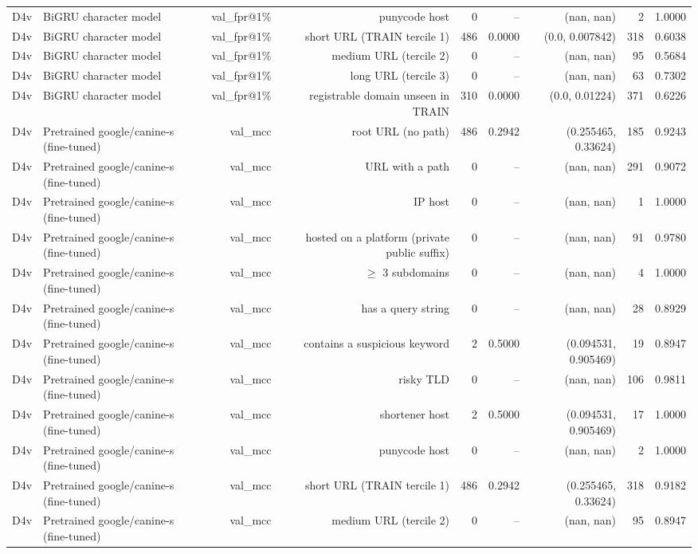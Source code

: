 \begin{table}[t]
\begin{tabular}{llrrrrrrr}
D4v & BiGRU character model & val\_fpr@1\% & punycode host & 0 & -- & (nan, nan) & 2 & 1.0000 \\
D4v & BiGRU character model & val\_fpr@1\% & short URL (TRAIN tercile 1) & 486 & 0.0000 & (0.0, 0.007842) & 318 & 0.6038 \\
D4v & BiGRU character model & val\_fpr@1\% & medium URL (tercile 2) & 0 & -- & (nan, nan) & 95 & 0.5684 \\
D4v & BiGRU character model & val\_fpr@1\% & long URL (tercile 3) & 0 & -- & (nan, nan) & 63 & 0.7302 \\
D4v & BiGRU character model & val\_fpr@1\% & registrable domain unseen in TRAIN & 310 & 0.0000 & (0.0, 0.01224) & 371 & 0.6226 \\
D4v & Pretrained google/canine-s (fine-tuned) & val\_mcc & root URL (no path) & 486 & 0.2942 & (0.255465, 0.33624) & 185 & 0.9243 \\
D4v & Pretrained google/canine-s (fine-tuned) & val\_mcc & URL with a path & 0 & -- & (nan, nan) & 291 & 0.9072 \\
D4v & Pretrained google/canine-s (fine-tuned) & val\_mcc & IP host & 0 & -- & (nan, nan) & 1 & 1.0000 \\
D4v & Pretrained google/canine-s (fine-tuned) & val\_mcc & hosted on a platform (private public suffix) & 0 & -- & (nan, nan) & 91 & 0.9780 \\
D4v & Pretrained google/canine-s (fine-tuned) & val\_mcc & $\geq$ 3 subdomains & 0 & -- & (nan, nan) & 4 & 1.0000 \\
D4v & Pretrained google/canine-s (fine-tuned) & val\_mcc & has a query string & 0 & -- & (nan, nan) & 28 & 0.8929 \\
D4v & Pretrained google/canine-s (fine-tuned) & val\_mcc & contains a suspicious keyword & 2 & 0.5000 & (0.094531, 0.905469) & 19 & 0.8947 \\
D4v & Pretrained google/canine-s (fine-tuned) & val\_mcc & risky TLD & 0 & -- & (nan, nan) & 106 & 0.9811 \\
D4v & Pretrained google/canine-s (fine-tuned) & val\_mcc & shortener host & 2 & 0.5000 & (0.094531, 0.905469) & 17 & 1.0000 \\
D4v & Pretrained google/canine-s (fine-tuned) & val\_mcc & punycode host & 0 & -- & (nan, nan) & 2 & 1.0000 \\
D4v & Pretrained google/canine-s (fine-tuned) & val\_mcc & short URL (TRAIN tercile 1) & 486 & 0.2942 & (0.255465, 0.33624) & 318 & 0.9182 \\
D4v & Pretrained google/canine-s (fine-tuned) & val\_mcc & medium URL (tercile 2) & 0 & -- & (nan, nan) & 95 & 0.8947 \\

\end{tabular}
\end{table}

